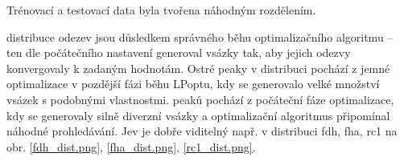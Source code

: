 Trénovací a testovací data byla tvořena náhodným rozdělením. 

 distribuce odezev jsou důsledkem správného běhu optimalizačního algoritmu -- ten dle počátečního nastavení generoval vsázky tak, aby jejich 
odezvy konvergovaly k zadaným hodnotám. Ostré peaky v distribuci pochází z jemné optimalizace v pozdější fázi běhu LPoptu, kdy se generovalo velké množství 
vsázek s podobnými vlastnostmi.  peaků pochází z počáteční fáze optimalizace, kdy se generovaly silně diverzní vsázky a optimalizační algoritmus 
připomínal náhodné prohledávání. Jev je dobře viditelný např. v distribuci \ac{fdh}, \ac{fha}, \ac{rc1} na obr. \ref{fdh_dist.png}, \ref{fha_dist.png}, \ref{rc1_dist.png}.


